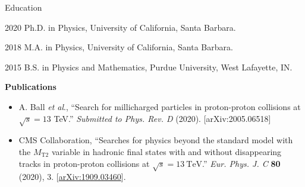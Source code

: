 \begin{vitae}

\begin{vitaesection}{Education}
\vspace{-1mm}
\item [2020] Ph.D. in Physics, University of California, Santa Barbara.
\item [2018] M.A. in Physics, University of California, Santa Barbara.
\item [2015] B.S. in Physics and Mathematics, Purdue University, West Lafayette, IN.
\end{vitaesection}

\vspace{5mm}
\textbf{Publications}


\begin{flushleft}

\begin{itemize}\setlength\itemsep{2mm}
\vspace{-3mm}

\item A. Ball \textit{et al}., ``Search for millicharged particles in proton-proton collisions at $\sqrt{s}=13$ TeV.''
\textit{Submitted to Phys. Rev. D} (2020). [arXiv:2005.06518]

\item CMS Collaboration, ``Searches for physics beyond the standard model with the $M_\mathrm{T2}$ variable in hadronic
  final states with and without disappearing tracks in proton-proton collisions at $\sqrt{s}=13~\mathrm{TeV}$.''
  \textit{Eur. Phys. J. C} \textbf{80} (2020), 3.
  [\href{https://arxiv.org/abs/1909.03460}{arXiv:1909.03460}].


\end{itemize}
\end{flushleft}
\end{vitae}
